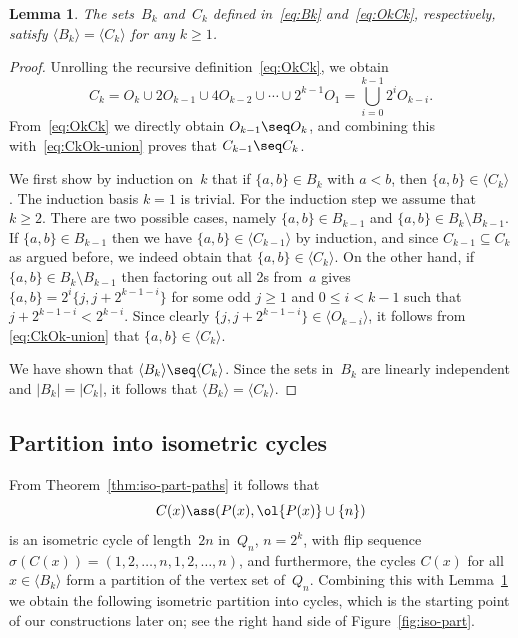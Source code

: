 \documentclass[a4paper,11pt,reqno]{amsart}
\newtheorem{lemma}[theorem]{Lemma}
\begin{document}
\begin{lemma}
\label{lem:BkCk}
The sets~$B_k$ and~$C_k$ defined in~\eqref{eq:Bk} and~\eqref{eq:OkCk}, respectively, satisfy $\langle B_k\rangle=\langle C_k\rangle$ for any $k\geq 1$.
\end{lemma}

\begin{proof}
Unrolling the recursive definition~\eqref{eq:OkCk}, we obtain
\begin{equation}
\label{eq:CkOk-union}
 C_k=O_k\cup 2O_{k-1}\cup 4O_{k-2}\cup\cdots\cup 2^{k-1}O_1=\bigcup_{i=0}^{k-1} 2^i O_{k-i}.
\end{equation}
From~\eqref{eq:OkCk} we directly obtain $O_{k-1}\seq O_k$, and combining this with~\eqref{eq:CkOk-union} proves that $C_{k-1}\seq C_k$.

We first show by induction on~$k$ that if $\{a,b\}\in B_k$ with $a<b$, then $\{a,b\}\in \langle C_k \rangle$.
The induction basis $k=1$ is trivial.
For the induction step we assume that $k\geq 2$.
There are two possible cases, namely $\{a,b\}\in B_{k-1}$ and $\{a,b\}\in B_k\setminus B_{k-1}$.
If $\{a,b\}\in B_{k-1}$ then we have $\{a,b\}\in \langle C_{k-1}\rangle$ by induction, and since $C_{k-1}\subseteq C_k$ as argued before, we indeed obtain that $\{a,b\}\in\langle C_k\rangle$.
On the other hand, if $\{a,b\}\in B_k\setminus B_{k-1}$ then factoring out all 2s from~$a$ gives $\{a,b\}=2^i\{j,j+2^{k-1-i}\}$ for some odd $j\geq 1$ and $0\le i<k-1$ such that $j+2^{k-1-i}<2^{k-i}$.
Since clearly $\{j,j+2^{k-1-i}\} \in \langle O_{k-i}\rangle$, it follows from \eqref{eq:CkOk-union} that $\{a,b\}\in \langle C_k \rangle$.

We have shown that $\langle B_k\rangle \seq \langle C_k\rangle$.
Since the sets in~$B_k$ are linearly independent and $|B_k|=|C_k|$, it follows that $\langle B_k\rangle =\langle C_k\rangle$.
\end{proof}

\subsection{Partition into isometric cycles}

From Theorem~\ref{thm:iso-part-paths} it follows that
\begin{equation}
\label{eq:Cx}
C(x)\ass (P(x),\ol{P(x)}\cup\{n\})
\end{equation}
is an isometric cycle of length~$2n$ in~$Q_n$, $n=2^k$, with flip sequence $\sigma(C(x))=(1,2,\ldots,n,1,2,\ldots,n)$, and furthermore, the cycles $C(x)$ for all $x\in\langle B_k\rangle$ form a partition of the vertex set of~$Q_n$.
Combining this with Lemma~\ref{lem:BkCk} we obtain the following isometric partition into cycles, which is the starting point of our constructions later on; see the right hand side of Figure~\ref{fig:iso-part}.
\end{document}
